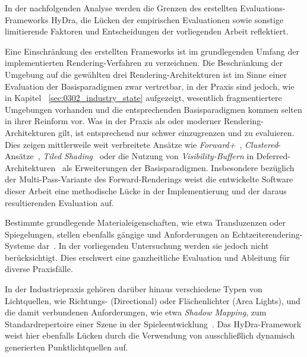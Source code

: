 In der nachfolgenden Analyse werden die Grenzen des erstellten Evaluations-Frameworks \ac{HyDra}, die Lücken der
empirischen Evaluationen sowie sonstige limitierende Faktoren und Entscheidungen der vorliegenden Arbeit reflektiert.

Eine Einschränkung des erstellten Frameworks ist im grundlegenden Umfang der implementierten Rendering-Verfahren zu
verzeichnen.
Die Beschränkung der Umgebung auf die gewählten drei Rendering-Architekturen ist im Sinne einer Evaluation der
Basisparadigmen zwar vertretbar, in der Praxis sind jedoch, wie in Kapitel ~\ref{sec:0302_industry_state} aufgezeigt,
wesentlich fragmentiertere Umgebungen vorhanden und die entsprechenden Basisparadigmen kommen selten in ihrer Reinform
vor.
Was in der Praxis als  oder  moderner Rendering-Architekturen gilt, ist
entsprechend nur schwer einzugrenzen und zu evaluieren.
Dies zeigen mittlerweile weit verbreitete Ansätze wie \textit{Forward+}~\parencite[vgl.][]{haradaForwardBringingDeferred2012},
\textit{Clustered}-Ansätze~\parencite[vgl.][]{olssonClusteredDeferredForward2012},
\textit{Tiled Shading}~\parencite[vgl.][]{olssonTiledClusteredForward2012} oder die Nutzung von
\textit{Visibility-Buffern} in Deferred-Architekturen~\parencite[vgl.][]{burnsVisibilityBufferCacheFriendly2013}
als Erweiterungen der Basisparadigmen.
Insbesondere bezüglich der Multi-Pass-Variante des Forward-Renderings weist die entwickelte Software dieser Arbeit eine
methodische Lücke in der Implementierung und der daraus resultierenden Evaluation auf.

Bestimmte grundlegende Materialeigenschaften, wie etwa Transluzenzen oder Spiegelungen, stellen ebenfalls gängige und
Anforderungen an Echtzeiterendering-Systeme
dar~\parencites(vgl.)()[Abschn.~\textit{Deferred G-buffer}]{muhammadPrettyFramesPRAGMATA2026}
[Abschn.~\textit{G-Buffer : Our approach}]{valientDeferredRenderingKillzone}
[S.~887]{akenine-mollerRealtimeRendering2019}.
In der vorliegenden Untersuchung werden sie jedoch nicht berücksichtigt.
Dies erschwert eine ganzheitliche Evaluation und Ableitung für diverse Praxisfälle.

In der Industriepraxis gehören darüber hinaus verschiedene Typen von Lichtquellen, wie Richtungs- (Directional) oder
Flächenlichter (Area Lights), und die damit verbundenen Anforderungen, wie etwa \textit{Shadow Mapping}, zum
Standardrepertoire einer Szene in der
Spieleentwicklung~\parencites(vgl.)()[Abschn.~2.4.1]{fonsecaDeferredShadingTutorial}
[Kap.~11.1.3.3]{gregoryGameEngineArchitecture2018}.
Das \ac{HyDra}-Framework weist hier ebenfalls Lücken durch die Verwendung von ausschließlich dynamisch generierten
Punktlichtquellen auf.

